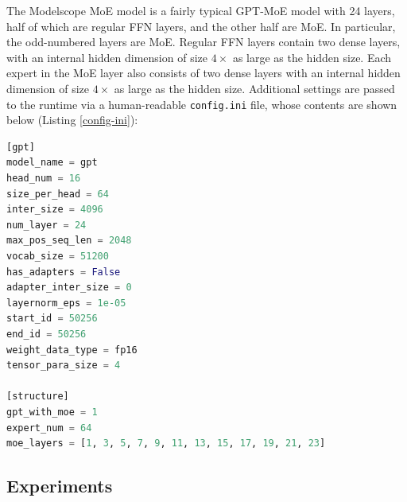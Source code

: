 The Modelscope MoE model is a fairly typical GPT-MoE model with 24 layers, half of which are regular FFN layers, and the other half are MoE. In particular, the odd-numbered layers are MoE. Regular FFN layers contain two dense layers, with an internal hidden dimension of size $4 \times$ as large as the hidden size. Each expert in the MoE layer also consists of two dense layers with an internal hidden dimension of size $4 \times$ as large as the hidden size. Additional settings are passed to the runtime via a human-readable \texttt{config.ini} file, whose contents are shown below (Listing \ref{config-ini}):

\begin{lstlisting}[language=Python, caption=config.ini, breaklines=true, basicstyle=\footnotesize, frame=single, label=config-ini]
[gpt]
model_name = gpt
head_num = 16
size_per_head = 64
inter_size = 4096
num_layer = 24
max_pos_seq_len = 2048
vocab_size = 51200
has_adapters = False
adapter_inter_size = 0
layernorm_eps = 1e-05
start_id = 50256
end_id = 50256
weight_data_type = fp16
tensor_para_size = 4

[structure]
gpt_with_moe = 1
expert_num = 64
moe_layers = [1, 3, 5, 7, 9, 11, 13, 15, 17, 19, 21, 23]
\end{lstlisting}


\subsection{Experiments}

